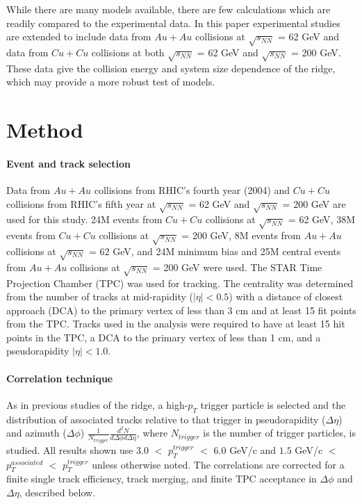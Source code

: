 \documentclass[aps,prc,twocolumn,groupedaddress,showpacs,preprintnumbers,amsmath,amssymb]{revtex4}
\newcommand{\sNNtwohundred}{$\sqrt{s_{NN}}$ = 200 GeV\xspace}
\newcommand{\sNNsixtytwo}{$\sqrt{s_{NN}}$ = 62 GeV\xspace}
\newcommand{\stdassoc}{$1.5$ GeV/c $<$ $p_T^{associated}$ $<$ $p_T^{trigger}$\xspace}
\newcommand{\stdtrig}{$3.0$ $<$ $p_T^{trigger}$ $<$ $6.0$ GeV/c\xspace}
\newcommand{\pT}{$p_T$\xspace}
\newcommand{\highpT}{high-\pT}
\newcommand{\ridge}{ridge\xspace}
\newcommand{\Cu}{$Cu+Cu$\xspace}
\newcommand{\Au}{$Au+Au$\xspace}
\newcommand{\dphi}{$\Delta\phi$\xspace}
\newcommand{\deta}{$\Delta\eta$\xspace}
\newcommand{\ntrig}{$N_{trigger}$\xspace}
\newcommand{\dNdphideta}{$\frac{1}{N_{trigger}} \frac{d^2N}{d\Delta\phi d\Delta\eta}$\xspace}
\begin{document}
While there are many models available, there are few calculations which are readily compared to the experimental data.  In this paper experimental studies are extended to include data from \Au collisions at \sNNsixtytwo and data from \Cu collisions at both \sNNsixtytwo and \sNNtwohundred.  These data give the collision energy and system size dependence of the \ridge, which may provide a more robust test of models.

\section{Method}
\paragraph*{Event and track selection}

Data from \Au collisions from RHIC's fourth year (2004) and \Cu collisions from RHIC's fifth year at \sNNsixtytwo and \sNNtwohundred are used for this study.  24M events from \Cu collisions at \sNNsixtytwo, 38M events from \Cu collisions at \sNNtwohundred, 8M events from \Au collisions at \sNNsixtytwo, and 24M minimum bias and 25M central events from \Au collisions at \sNNtwohundred were used.  The STAR Time Projection Chamber (TPC)\cite{STARNIM} was used for tracking.  The centrality was determined from the number of tracks at mid-rapidity ($|\eta|<0.5$) with a distance of closest approach (DCA) to the primary vertex of less than 3 cm and at least 15 fit points from the TPC.  Tracks used in the analysis were required to have at least 15 hit points in the TPC, a DCA to the primary vertex of less than 1 cm, and a pseudorapidity $|\eta|<1.0$.
\paragraph*{Correlation technique}
As in previous studies of the \ridge\cite{RidgePaper}, a \highpT trigger particle is selected and the distribution of associated tracks relative to that trigger in pseudorapidity (\deta) and azimuth (\dphi) \dNdphideta, where \ntrig is the number of trigger particles, is studied.  All results shown use \stdtrig and \stdassoc unless otherwise noted.  The correlations are corrected for a finite single track efficiency, track merging, and finite TPC acceptance in \dphi and \deta, described below.
\end{document}
